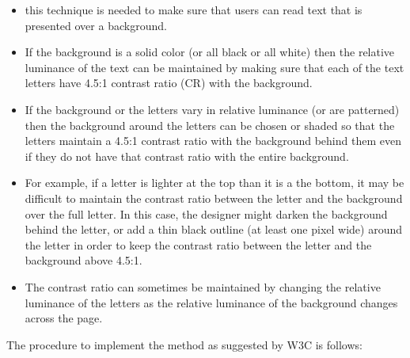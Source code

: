 \begin{itemize}
\item{}this technique is needed to make sure that users can read text that is presented over a background. 

\item{}If the background is a solid color (or all black or all white) then the relative luminance of the text can be maintained by making sure that each of the text letters have 4.5:1 contrast ratio (CR) with the background.

\item{}If the background or the letters vary in relative luminance (or are patterned) then the background around the letters can be chosen or shaded so that the letters maintain a 4.5:1 contrast ratio with the background behind them even if they do not have that contrast ratio with the entire background.

\item{}For example, if a letter is lighter at the top than it is a the bottom, it may be difficult to maintain the contrast ratio between the letter and the background over the full letter. In this case, the designer might darken the background behind the letter, or add a thin black outline (at least one pixel wide) around the letter in order to keep the contrast ratio between the letter and the background above 4.5:1.

\item{}The contrast ratio can sometimes be maintained by changing the relative luminance of the letters as the relative luminance of the background changes across the page.

\end{itemize}

The procedure to implement the method as suggested by W3C is follows:

